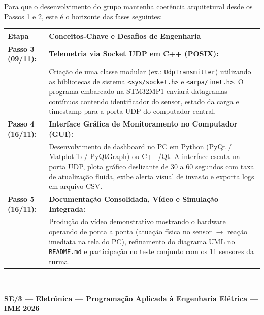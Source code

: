 \documentclass[11pt,a4paper]{article}
\begin{document}
Para que o desenvolvimento do grupo mantenha coerência arquitetural desde os Passos 1 e 2, este é o horizonte das fases seguintes:

\begin{center}
\begin{tabular}{lp{12.0cm}}
    \toprule
    \textbf{Etapa} & \textbf{Conceitos-Chave e Desafios de Engenharia} \\
    \midrule
    \textbf{Passo 3 (09/11):} & \textbf{Telemetria via Socket UDP em C++ (POSIX):} \\
    & Criação de uma classe modular (ex.: \texttt{UdpTransmitter}) utilizando as bibliotecas de sistema \texttt{<sys/socket.h>} e \texttt{<arpa/inet.h>}. O programa embarcado na STM32MP1 enviará datagramas contínuos contendo identificador do sensor, estado da carga e timestamp para a porta UDP do computador central. \\
    \midrule
    \textbf{Passo 4 (16/11):} & \textbf{Interface Gráfica de Monitoramento no Computador (GUI):} \\
    & Desenvolvimento de dashboard no PC em Python (PyQt / Matplotlib / PyQtGraph) ou C++/Qt. A interface escuta na porta UDP, plota gráfico deslizante de 30 a 60 segundos com taxa de atualização fluida, exibe alerta visual de invasão e exporta logs em arquivo CSV. \\
    \midrule
    \textbf{Passo 5 (16/11):} & \textbf{Documentação Consolidada, Vídeo e Simulação Integrada:} \\
    & Produção do vídeo demonstrativo mostrando o hardware operando de ponta a ponta (atuação física no sensor $\rightarrow$ reação imediata na tela do PC), refinamento do diagrama UML no \texttt{README.md} e participação no teste conjunto com os 11 sensores da turma. \\
    \bottomrule
\end{tabular}
\end{center}

\vspace{0.4cm}
\begin{center}
    \rule{0.6\textwidth}{0.4pt}\\[0.2cm]
    {\small \textbf{SE/3 --- Eletrônica --- Programação Aplicada à Engenharia Elétrica --- IME 2026}}
\end{center}
\end{document}
